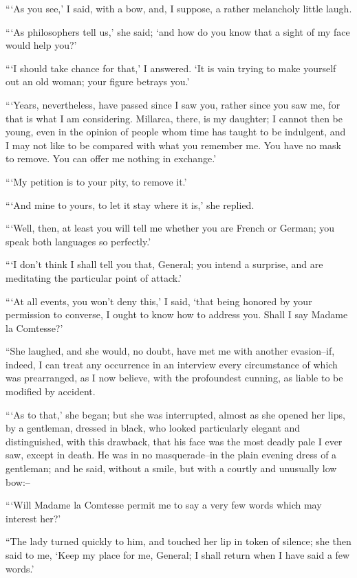 \documentclass[11pt,twoside,makeidx,hidelinks,]{memoir}
\begin{document}
``{}`As you see,' I said, with a bow, and, I suppose, a rather melancholy
little laugh.

``{}`As philosophers tell us,' she said; `and how do you know that a sight
of my face would help you?'

``{}`I should take chance for that,' I answered. `It is vain trying to make
yourself out an old woman; your figure betrays you.'

``{}`Years, nevertheless, have passed since I saw you, rather since you saw
me, for that is what I am considering. Millarca, there, is my daughter;
I cannot then be young, even in the opinion of people whom time has
taught to be indulgent, and I may not like to be compared with what you
remember me. You have no mask to remove. You can offer me nothing in
exchange.'

``{}`My petition is to your pity, to remove it.'

``{}`And mine to yours, to let it stay where it is,' she replied.

``{}`Well, then, at least you will tell me whether you are French or
German; you speak both languages so perfectly.'

``{}`I don't think I shall tell you that, General; you intend a surprise,
and are meditating the particular point of attack.'

``{}`At all events, you won't deny this,' I said, `that being honored by
your permission to converse, I ought to know how to address you. Shall I
say Madame la Comtesse?'

``She laughed, and she would, no doubt, have met me with another
evasion--if, indeed, I can treat any occurrence in an interview every
circumstance of which was prearranged, as I now believe, with the
profoundest cunning, as liable to be modified by accident.

``{}`As to that,' she began; but she was interrupted, almost as she opened
her lips, by a gentleman, dressed in black, who looked particularly
elegant and distinguished, with this drawback, that his face was the
most deadly pale I ever saw, except in death. He was in no
masquerade--in the plain evening dress of a gentleman; and he said,
without a smile, but with a courtly and unusually low bow:--

``{}`Will Madame la Comtesse permit me to say a very few words which may
interest her?'

``The lady turned quickly to him, and touched her lip in token of
silence; she then said to me, `Keep my place for me, General; I shall
return when I have said a few words.'
\end{document}
